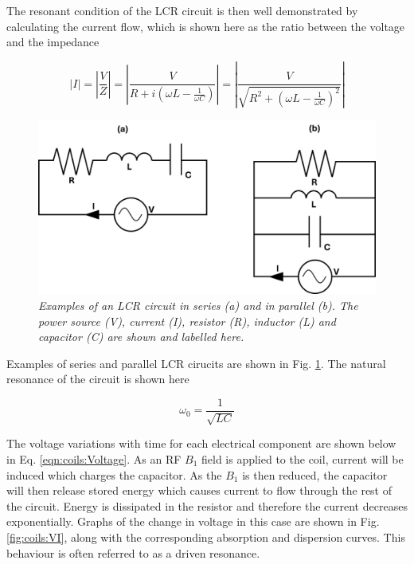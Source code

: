 The resonant condition of the LCR circuit is then well demonstrated by calculating the current flow, which is shown here as the ratio between the voltage and the impedance

\begin{equation}
    |I| = \left| \frac{V}{Z} \right| = \left| \frac{V}{R+i(\omega L - \frac{1}{\omega C})} \right| = \left| \frac{V}{\sqrt{R^2+(\omega L - \frac{1}{\omega C})^2}} \right|
    \label{eqn:coils:I}
\end{equation}

\begin{figure}
    \centering
    \includegraphics[width=0.9\linewidth]{Figures/Coils/RLC_Circuit.png}
    \caption{\textit{Examples of an LCR circuit in series (a) and in parallel (b). The power source (V), current (I), resistor (R), inductor (L) and capacitor (C) are shown and labelled here.}}
    \label{fig:coils:RLC}
\end{figure}

Examples of series and parallel LCR cirucits are shown in Fig. \ref{fig:coils:RLC}. The natural resonance of the circuit is shown here

\begin{equation}
    \omega_0 = \frac{1}{\sqrt{LC}}
    \label{eqn:coils:res}
\end{equation}

The voltage variations with time for each electrical component are shown below in Eq. \ref{eqn:coils:Voltage}. As an \ac{RF} $B_1$ field is applied to the coil, current will be induced which charges the capacitor. As the $B_1$ is then reduced, the capacitor will then release stored energy which causes current to flow through the rest of the circuit. Energy is dissipated in the resistor and therefore the current decreases exponentially. Graphs of the change in voltage in this case are shown in Fig. \ref{fig:coils:VI}, along with the corresponding absorption and dispersion curves. This behaviour is often referred to as a driven resonance.

